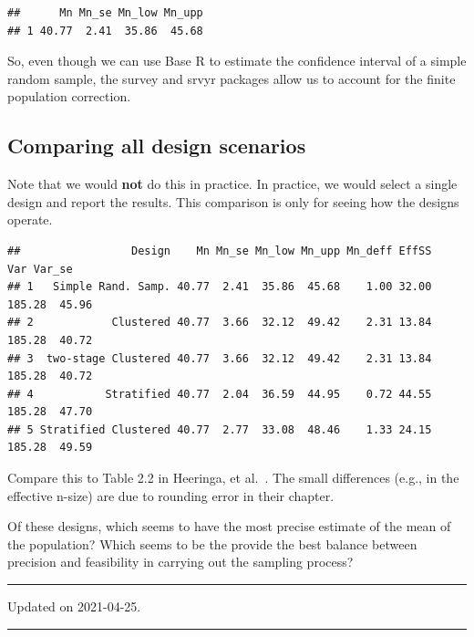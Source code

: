 \documentclass[
]{article}
\begin{document}
\begin{verbatim}
##      Mn Mn_se Mn_low Mn_upp
## 1 40.77  2.41  35.86  45.68
\end{verbatim}

So, even though we can use Base R to estimate the confidence interval of a simple random sample, the survey and srvyr packages allow us to account for the finite population correction.

\hypertarget{comparing-all-design-scenarios}{%
\subsection{Comparing all design scenarios}\label{comparing-all-design-scenarios}}

Note that we would \textbf{not} do this in practice. In practice, we would select a single design and report the results. This comparison is only for seeing how the designs operate.

\begin{verbatim}
##                 Design    Mn Mn_se Mn_low Mn_upp Mn_deff EffSS    Var Var_se
## 1   Simple Rand. Samp. 40.77  2.41  35.86  45.68    1.00 32.00 185.28  45.96
## 2            Clustered 40.77  3.66  32.12  49.42    2.31 13.84 185.28  40.72
## 3  two-stage Clustered 40.77  3.66  32.12  49.42    2.31 13.84 185.28  40.72
## 4           Stratified 40.77  2.04  36.59  44.95    0.72 44.55 185.28  47.70
## 5 Stratified Clustered 40.77  2.77  33.08  48.46    1.33 24.15 185.28  49.59
\end{verbatim}

Compare this to Table 2.2 in Heeringa, et al.~\citeyearpar{heeringa_applied_2010}. The small differences (e.g., in the effective n-size) are due to rounding error in their chapter.

Of these designs, which seems to have the most precise estimate of the mean of the population? Which seems to be the provide the best balance between precision and feasibility in carrying out the sampling process?

\begin{center}\rule{0.5\linewidth}{0.5pt}\end{center}

Updated on 2021-04-25.

\begin{center}\rule{0.5\linewidth}{0.5pt}\end{center}

  
\end{document}
